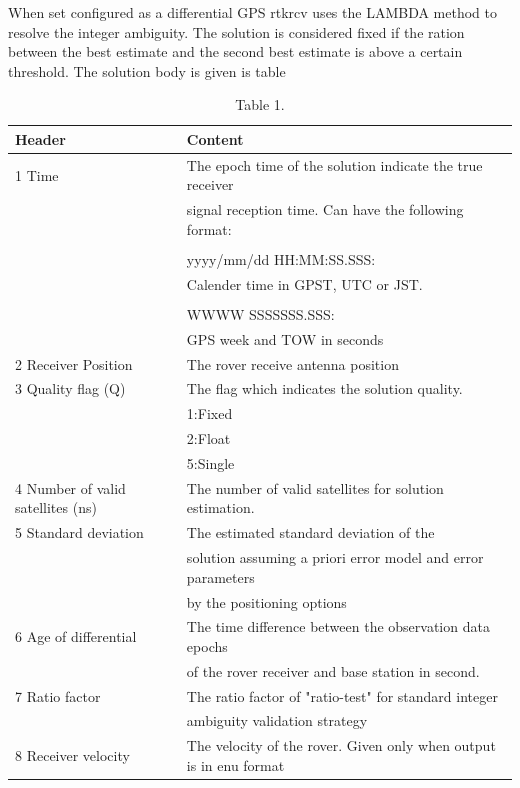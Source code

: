 When set configured as a differential GPS rtkrcv uses the LAMBDA method to resolve the integer ambiguity. The solution is considered fixed if the ration between the best estimate and the second best estimate is above a certain threshold.
The solution body is given is table 
\begin{table}[!h]
\begin{center}
    \begin{tabular}{ | l | l |}
    \hline
    \textbf{Header} & \textbf{Content} \\ \hline
     1 Time & The epoch time of the solution indicate the true receiver\\& signal reception time. Can have the following format:\\&\\& yyyy/mm/dd HH:MM:SS.SSS:\\& Calender time in GPST, UTC or JST.\\&\\&
     
     WWWW SSSSSSS.SSS:\\&
     GPS week and TOW in seconds  \\ \hline
     2 Receiver Position & The rover receive antenna position \\ \hline
     3 Quality flag (Q) & The flag which indicates the solution quality.\\& 1:Fixed\\& 2:Float\\& 5:Single \\ \hline
     4 Number of valid satellites (ns) & The number of valid satellites for solution estimation. \\ \hline
     5 Standard deviation & The estimated standard deviation of the\\& solution assuming a priori error model and error parameters\\& by the positioning options \\ \hline
     6 Age of differential & The time difference between the observation data epochs\\& of the rover receiver and base station in second. \\ \hline
     7 Ratio factor & The ratio factor of "ratio-test" for standard integer\\& ambiguity validation strategy \\ \hline
     8 Receiver velocity & The velocity of the rover. Given only when output is in enu format \\ \hline
    \end{tabular}
\end{center}
\caption{Table 1. }
\label{Tab1}
\end{table}
 
